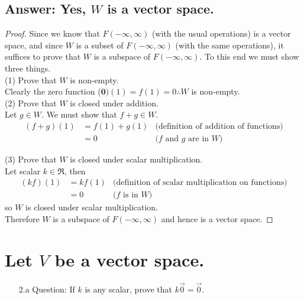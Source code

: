 \documentclass[11pt]{article}
\begin{document}
\subsection{Answer: Yes, $W$ is a vector space.}
\begin{proof}
        Since we know that $F(-\infty, \infty)$ (with the usual operations) is a vector space,
        and since $W$ is a subset of $F(-\infty, \infty)$ (with the same operations),
        it suffices to prove that $W$ is a subspace of $F(-\infty, \infty)$. To this end we must show three things.\\

        (1) Prove that $W$ is non-empty.\\
        Clearly the zero function ($\mathbf{0})(1)=f(1)=0\therefore W$ is non-empty.\\

        (2) Prove that $W$ is closed under addition.\\
        Let $g \in W$. We must show that $f+g \in W$.
        \begin{align*}
                (f+g)(1) & = f(1) + g(1) & \textrm{(definition of addition of functions)} \\
                         & = 0           & \textrm{($f$ and $g$ are in $W$)}
        \end{align*}

        (3) Prove that $W$ is closed under scalar multiplication. \\
        Let scalar $k \in \Re $, then
        \begin{align*}
                (kf)(1) & = kf(1) & \textrm{(definition of scalar multiplication on functions)} \\
                        & = 0     & \textrm{($f$ is in $W$)}
        \end{align*}
        so $W$ is closed under scalar multiplication.\\

        Therefore $W$ is a subspace of $F(-\infty, \infty)$ and hence is a vector space.
\end{proof}
\pagebreak
\section{Let $V$ be a vector space.}
\begin{enumerate}
        \item [2.a]Question: If $k$ is any scalar, prove that $k\vec{0} = \vec{0}$.
\end{enumerate}
\end{document}

